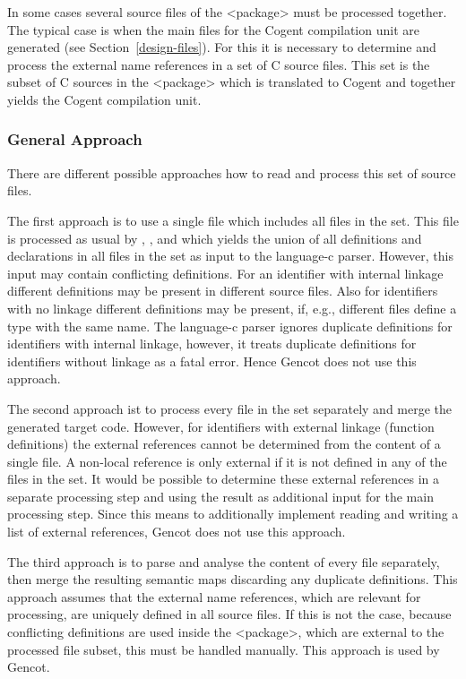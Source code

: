 In some cases several source files of the <package> must be processed together. The typical case is when the main
files for the Cogent compilation unit are generated (see Section~\ref{design-files}). For this it is necessary 
to determine and process the external name references in a set of
C source files. This set is the subset of C sources in the <package> which is translated to Cogent and together yields
the Cogent compilation unit. 

\subsubsection{General Approach}

There are different possible approaches how to read and process this set of source files.

The first approach is to use a single file which includes all files in the set. This file is processed as usual by
, , and  which yields the union of all definitions
and declarations in all files in the set as input to the language-c parser. However, this input may contain conflicting
definitions. For an identifier with internal linkage different definitions may be present in different source files.
Also for identifiers with no linkage different definitions may be present, if, e.g., different  files define
a type with the same name. The language-c parser ignores duplicate definitions for identifiers with internal linkage,
however, it treats duplicate definitions for identifiers without linkage as a fatal error. Hence Gencot does not use
this approach.

The second approach ist to process every file in the set separately and merge the generated target code. However, for
identifiers with external linkage (function definitions) the external references cannot be determined from the content
of a single file. A non-local reference is only external if it is not defined in any of the files in the set. It would
be possible to determine these external references in a separate processing step and using the result as additional input
for the main processing step. Since this means to additionally implement reading and writing a list of external references,
Gencot does not use this approach.

The third approach is to parse and analyse the content of every file separately, then merge the resulting semantic maps
discarding any duplicate definitions. This approach assumes that the external name references, which are relevant for
processing, are uniquely defined in all source files. If this is not the case, because conflicting definitions are used
inside the <package>, which are external to the processed file subset, this must be handled manually. 
This approach is used by Gencot.

